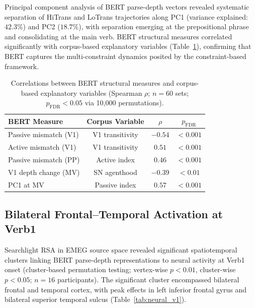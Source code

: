 \documentclass[11pt]{article}
\begin{document}
Principal component analysis of BERT parse-depth vectors revealed systematic separation of HiTrans and LoTrans trajectories along PC1 (variance explained: $42.3\%$) and PC2 ($18.7\%$), with separation emerging at the prepositional phrase and consolidating at the main verb. BERT structural measures correlated significantly with corpus-based explanatory variables (Table~\ref{tab:bert_corpus}), confirming that BERT captures the multi-constraint dynamics posited by the constraint-based framework.

\begin{table}[H]
\centering
\caption{Correlations between BERT structural measures and corpus-based explanatory variables (Spearman $\rho$; $n = 60$ sets; $p_{\mathrm{FDR}} < 0.05$ via 10,000 permutations).}
\label{tab:bert_corpus}
\begin{tabular}{lccc}
\toprule
BERT Measure & Corpus Variable & $\rho$ & $p_{\mathrm{FDR}}$ \\
\midrule
Passive mismatch (V1) & V1 transitivity & $-0.54$ & $< 0.001$ \\
Active mismatch (V1) & V1 transitivity & $0.51$ & $< 0.001$ \\
Passive mismatch (PP) & Active index & $0.46$ & $< 0.001$ \\
V1 depth change (MV) & SN agenthood & $-0.39$ & $< 0.01$ \\
PC1 at MV & Passive index & $0.57$ & $< 0.001$ \\
\bottomrule
\end{tabular}
\end{table}

\subsection{Bilateral Frontal--Temporal Activation at Verb1}

Searchlight RSA in EMEG source space revealed significant spatiotemporal clusters linking BERT parse-depth representations to neural activity at Verb1 onset (cluster-based permutation testing; vertex-wise $p < 0.01$, cluster-wise $p < 0.05$; $n = 16$ participants). The significant cluster encompassed bilateral frontal and temporal cortex, with peak effects in left inferior frontal gyrus and bilateral superior temporal sulcus (Table~\ref{tab:neural_v1}).
\end{document}
